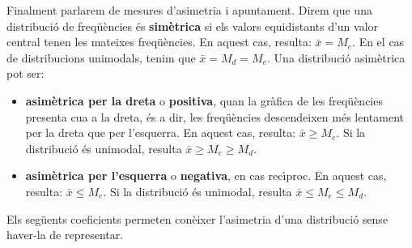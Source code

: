 Finalment parlarem de mesures d'asimetria i apuntament. 
Direm que una distribuci\'o de freq\"u\`encies 
\'es {\bf sim\`etrica} si els valors 
equidistants d'un valor central tenen les mateixes freq\"u\`encies. 
En aquest cas, resulta: $\bar{x} = M_e$. En el cas de distribucions
unimodals, tenim que $\bar{x} =M_d = M_e$.
Una distribuci\'o asim\`etrica pot ser:

\begin{itemize}

\item {\bf asim\`etrica per la dreta} o {\bf positiva}, 
 quan la gr\`afica de les
freq\"u\`encies presenta cua a la dreta, \'es a dir, les freq\"u\`encies descendeixen m\'es
lentament per la dreta que per l'esquerra. En aquest cas, resulta: $\bar{x}
\geq M_e$. Si la distribuci\'o \'es unimodal, resulta 
$\bar{x}\geq M_e \geq M_d$.

\item {\bf asim\`etrica per l'esquerra} o {\bf negativa}, 
 en cas rec\'{\i}proc. En
aquest cas, resulta: $\bar{x} \leq M_e$.
Si la distribuci\'o \'es unimodal, resulta $\bar{x} \leq M_e \leq M_d$.
\end{itemize}

Els seg\"uents coeficients permeten con\`eixer l'asimetria d'una distribuci\'o sense
haver-la de representar.

